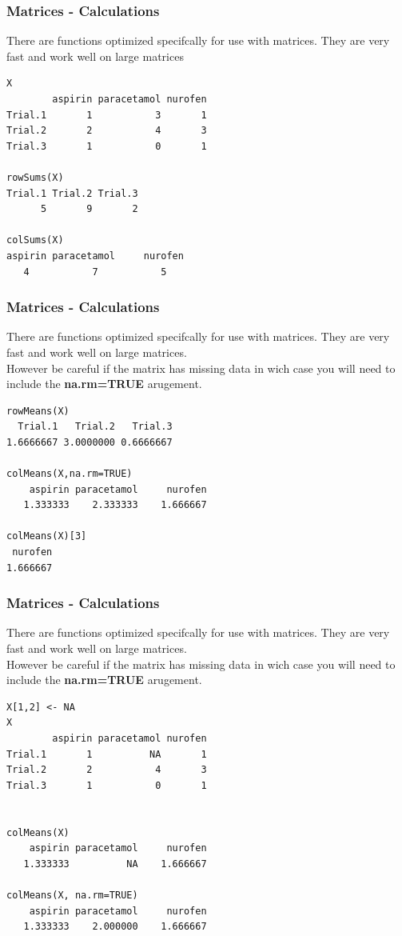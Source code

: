 \documentclass{beamer}
\begin{document}
%

\begin{frame}[fragile]
\frametitle{Matrices - Calculations}
There are functions optimized specifcally for use with matrices. They are very fast and work well on large matrices
\footnotesize
\begin{verbatim}
X
        aspirin paracetamol nurofen
Trial.1       1           3       1
Trial.2       2           4       3
Trial.3       1           0       1

rowSums(X)
Trial.1 Trial.2 Trial.3 
      5       9       2 

colSums(X)
aspirin paracetamol     nurofen 
   4           7           5 
\end{verbatim}
\end{frame}

%

\begin{frame}[fragile]
\frametitle{Matrices - Calculations}
There are functions optimized specifcally for use with matrices. They are very fast and work well on large matrices. \\
\vspace{0.25cm}
However be careful if the matrix has missing data in wich case you will need to include the \textbf{na.rm=TRUE} arugement.
\footnotesize
\begin{verbatim}
rowMeans(X)
  Trial.1   Trial.2   Trial.3 
1.6666667 3.0000000 0.6666667 

colMeans(X,na.rm=TRUE)
    aspirin paracetamol     nurofen 
   1.333333    2.333333    1.666667 
 
colMeans(X)[3]
 nurofen 
1.666667 
\end{verbatim}
\end{frame}

%

\begin{frame}[fragile]
\frametitle{Matrices - Calculations}
There are functions optimized specifcally for use with matrices. They are very fast and work well on large matrices. \\
\vspace{0.25cm}
However be careful if the matrix has missing data in wich case you will need to include the \textbf{na.rm=TRUE} arugement.
\footnotesize
\begin{verbatim}
X[1,2] <- NA
X
        aspirin paracetamol nurofen
Trial.1       1          NA       1
Trial.2       2           4       3
Trial.3       1           0       1


colMeans(X)
    aspirin paracetamol     nurofen 
   1.333333          NA    1.666667 
 
colMeans(X, na.rm=TRUE)
    aspirin paracetamol     nurofen 
   1.333333    2.000000    1.666667 

\end{verbatim}
\end{frame}
\end{document}
